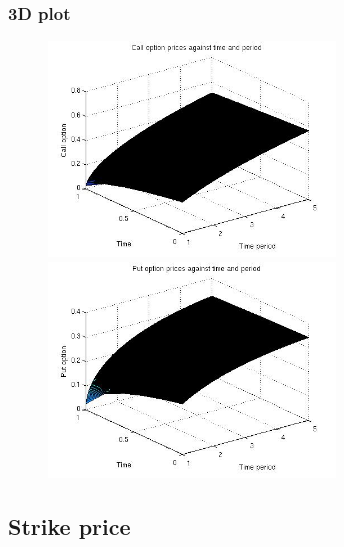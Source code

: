 \documentclass[12pt]{article}
\begin{document}
    \subsubsection*{3D plot}
    \begin{figure}[ht]
    \centering
      \begin{minipage}{.45\textwidth}
        \centering
        \includegraphics[width=3in]{call-time-per.jpg}
      \end{minipage}
      \begin{minipage}{.45\textwidth}
        \centering
        \includegraphics[width=3in]{put-time-per.jpg}
      \end{minipage}
    \end{figure}

  \newpage
  \subsection*{Strike price}
\end{document}
